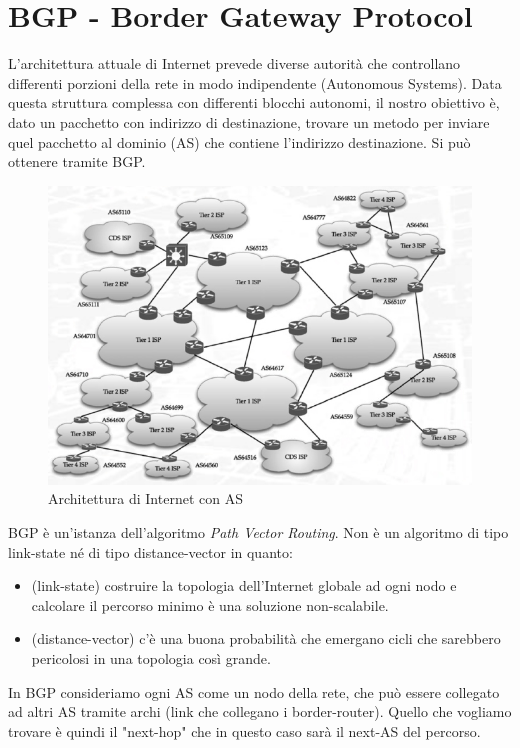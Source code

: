 \documentclass{article}
\begin{document}
\section{BGP - Border Gateway Protocol}
L'architettura attuale di Internet prevede diverse autorità che controllano differenti porzioni della rete in modo indipendente (Autonomous Systems). Data questa struttura complessa con differenti blocchi autonomi, il nostro obiettivo è, dato un pacchetto con indirizzo di destinazione, trovare un metodo per inviare quel pacchetto al dominio (AS) che contiene l'indirizzo destinazione. Si può ottenere tramite BGP.
\begin{figure}[H]
    \centering
    \includegraphics[scale=0.5]{figures/internet_architecture.jpg}
    \caption{Architettura di Internet con AS}
\end{figure}
BGP è un'istanza dell'algoritmo \textit{Path Vector Routing}. Non è un algoritmo di tipo link-state né di tipo distance-vector in quanto:
\begin{itemize}
    \item (link-state) costruire la topologia dell'Internet globale ad ogni nodo e calcolare il percorso minimo è una soluzione non-scalabile.
    \item (distance-vector) c'è una buona probabilità che emergano cicli che sarebbero pericolosi in una topologia così grande.
\end{itemize}
In BGP consideriamo ogni AS come un nodo della rete, che può essere collegato ad altri AS tramite archi (link che collegano i border-router). Quello che vogliamo trovare è quindi il "next-hop" che in questo caso sarà il next-AS del percorso.\\
\end{document}
